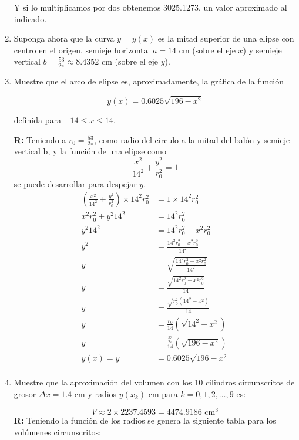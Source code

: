 \documentclass[12pt]{article}
\begin{document}
\begin{enumerate}
 Y si lo multiplicamos por dos obtenemos 3025.1273, un valor aproximado al indicado.
  
 
\item Suponga ahora que la curva \( y = y(x) \) es la mitad superior de una elipse con centro en el origen, semieje horizontal \( a = 14 \) cm (sobre el eje \( x \)) y semieje vertical \( b = \frac{53}{2\pi} \approx 8.4352 \) cm (sobre el eje \( y \)).

\item Muestre que el arco de elipse es, aproximadamente, la gráfica de la función

\[
y(x) = 0.6025 \sqrt{196 - x^2}
\]

definida para \(-14 \leq x \leq 14\).

{\bf R:} Teniendo a $r_0 = \frac{53}{2\pi}$, como radio del circulo a la mitad del balón y semieje vertical b, y la función de una elipse como
\[\frac{x^2}{14^2}+\frac{y^2}{r_0^2}=1\]
se puede desarrollar para despejar $y$.
    \begin{align*}
        \left( \frac{x^2}{14^2} + \frac{y^2}{r_0^2} \right) \times 14^2r_0^2 &= 1 \times 14^2r_0^2\\
        x^2 r_0^2 + y^2 14^2 &= 14^2 r_0^2\\
        y^2 14^2 &= 14^2 r_0^2 - x^2 r_0^2\\
        y^2 &= \frac{14^2 r_0^2 - x^2 r_0 ^2}{14^2}\\
        y &=\sqrt{\frac{14^2r_0^2 -x^2r_0 ^2}{14^2}}\\
        y &=\frac{\sqrt{14^2r_0^2 -x^2r_0 ^2}}{14}\\
        y &=\frac{\sqrt{r_0^2(14^2 -x^2)}}{14}\\
        y &=\frac{r_0}{14}\left(\sqrt{14^2 -x^2}\right)\\
        y &=\frac{\frac{53}{2\pi}}{14}\left(\sqrt{196 -x^2}\right)\\
        y(x)=y &=0.6025\sqrt{196 -x^2}\\
    \end{align*}

\item Muestre que la aproximación del volumen con los 10 cilindros circunscritos de grosor \( \Delta x = 1.4 \) cm y radios \( y(x_k) \) cm para \( k = 0, 1, 2, \ldots, 9 \) es:

\[
V \approx 2 \times 2237.4593 = 4474.9186 \text{ cm}^3
\]
{\bf R:} Teniendo la función de los radios se genera la siguiente tabla para los volúmenes circunscritos:
  

\end{enumerate}
\end{document}
